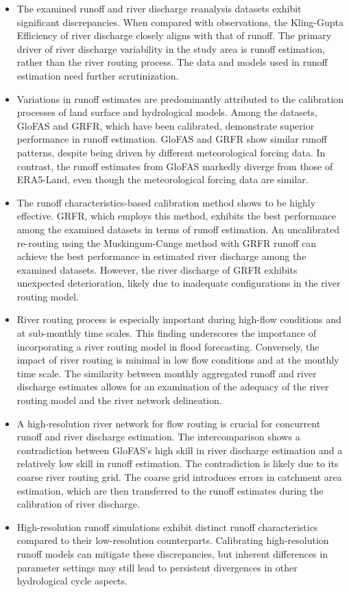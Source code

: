 \documentclass[water,article,submit,pdftex,moreauthors]{Definitions/mdpi}
\begin{document}
\begin{itemize}
  \item The examined runoff and river discharge reanalysis datasets exhibit significant discrepancies. When compared with observations, the Kling-Gupta Efficiency of river discharge closely aligns with that of runoff. The primary driver of river discharge variability in the study area is runoff estimation, rather than the river routing process. The data and models used in runoff estimation need further scrutinization.
  \item Variations in runoff estimates are predominantly attributed to the calibration processes of land surface and hydrological models. Among the datasets, GloFAS and GRFR, which have been calibrated, demonstrate superior performance in runoff estimation. GloFAS and GRFR show similar runoff patterns, despite being driven by different meteorological forcing data. In contrast, the runoff estimates from GloFAS markedly diverge from those of ERA5-Land, even though the meteorological forcing data are similar.
  \item The runoff characteristics-based calibration method shows to be highly effective. GRFR, which employs this method, exhibits the best performance among the examined datasets in terms of runoff estimation. An uncalibrated re-routing using the Muskingum-Cunge method with GRFR runoff can achieve the best performance in estimated river discharge among the examined datasets. However, the river discharge of GRFR exhibits unexpected deterioration, likely due to inadequate configurations in the river routing model.
  \item River routing process is especially important during high-flow conditions and at sub-monthly time scales. This finding underscores the importance of incorporating a river routing model in flood forecasting. Conversely, the impact of river routing is minimal in low flow conditions and at the monthly time scale. The similarity between monthly aggregated runoff and river discharge estimates allows for an examination of the adequacy of the river routing model and the river network delineation.
  \item A high-resolution river network for flow routing is crucial for concurrent runoff and river discharge estimation. The intercomparison shows a contradiction between GloFAS's high skill in river discharge estimation and a relatively low skill in runoff estimation. The contradiction is likely due to its coarse river routing grid. The coarse grid introduces errors in catchment area estimation, which are then transferred to the runoff estimates during the calibration of river discharge.
  \item High-resolution runoff simulations exhibit distinct runoff characteristics compared to their low-resolution counterparts. Calibrating high-resolution runoff models can mitigate these discrepancies, but inherent differences in parameter settings may still lead to persistent divergences in other hydrological cycle aspects.
\end{itemize}
\end{document}
